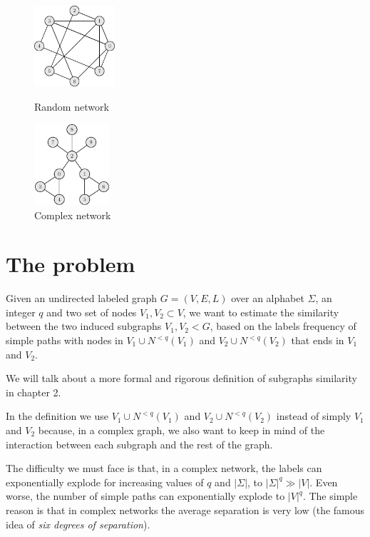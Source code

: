 \begin{figure}[h]
	\centering
	\begin{minipage}[t]{.45\textwidth}
		\centering
		\includegraphics[width=3cm,height=3cm]{figure/figure-1-3}
		\caption{Random network}
	\end{minipage}\hfill
	\begin{minipage}[t]{.45\textwidth}
		\centering
		\includegraphics[width=2.8cm,height=3cm]{figure/figure-1-4}
		\caption{Complex network}
	\end{minipage}
\end{figure}

\section{The problem}

\begin{problema}
	Given an undirected labeled graph $G=(V,E,L)$ over an alphabet $\Sigma$, an integer $q$
	and two set of nodes $V_{1}, V_{2} \subset V$, we want to estimate the similarity between the two induced subgraphs $V_{1}, V_{2} < G$, based on the labels frequency of simple paths with nodes in $V_{1} \cup N^{<q}(V_{1})$ and $V_{2} \cup N^{<q}(V_{2})$ that ends in $V_1$ and $V_2$.
\end{problema}

We will talk about a more formal and rigorous definition of subgraphs similarity in chapter 2.\medskip

In the definition we use $V_{1} \cup N^{<q}(V_{1})$ and $V_{2} \cup N^{<q}(V_{2})$ instead of simply $V_{1}$ and $V_{2}$ because, in a complex graph, we also want to keep in mind of the interaction between each subgraph and the rest of the graph.\medskip

The difficulty we must face is that, in a complex network, the labels can exponentially explode for increasing values of $q$ and $|\Sigma|$, to $|\Sigma|^{q} \gg |V|$. Even worse, the number of simple paths can exponentially explode to $|V|^{q}$.  The simple reason is that in complex networks the average separation is very low (the famous idea of \textit{six degrees of separation}).\medskip

